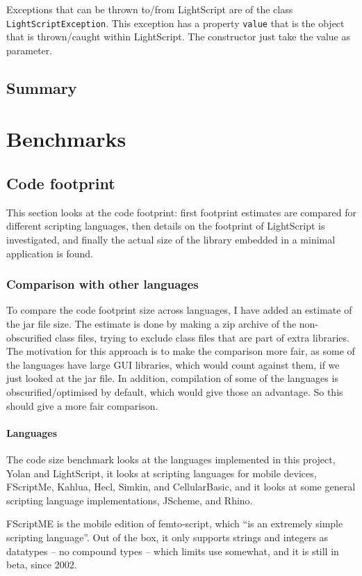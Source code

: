 \documentclass[11pt]{report}
\begin{document}
Exceptions that can be thrown to/from LightScript are of the class \verb|LightScriptException|. This exception has a property \verb|value| that is the object that is thrown/caught within LightScript. The constructor just take the value as parameter.

\section{Summary}
\chapter{Benchmarks}
\label{benchmark}

\section{Code footprint}
This section looks at the code footprint: first footprint estimates are compared for different scripting languages, then details on the footprint of LightScript is investigated, and finally the actual size of the library embedded in a minimal application is found.

\subsection{Comparison with other languages}
To compare the code footprint size across languages, I have added an estimate of the jar file size. 
The estimate is done by making a zip archive of the non-obscurified class files,
trying to exclude class files that are part of extra libraries.
The motivation for this approach is to make the comparison more fair, as some of the languages have large GUI libraries,
which would count against them, if we just looked at the jar file. 
In addition, compilation of some of the languages is obscurified/optimised by default,
which would give those an advantage. So this should give a more fair comparison.

\subsubsection{Languages}
\label{codefootprint-languages}
The code size benchmark looks at the languages implemented in this project, Yolan and LightScript, it looks at scripting languages for mobile devices, FScriptMe, Kahlua, Hecl, Simkin, and CellularBasic, and it looks at some general scripting language implementations,  JScheme, and Rhino.

FScriptME\cite{fscriptme} is the mobile edition of femto-script, which ``is an extremely simple scripting language''\cite{fscript}. 
Out of the box, it only supports strings and integers as datatypes -- no compound types -- which limits use somewhat, and it is still in beta, since 2002. 
\end{document}
